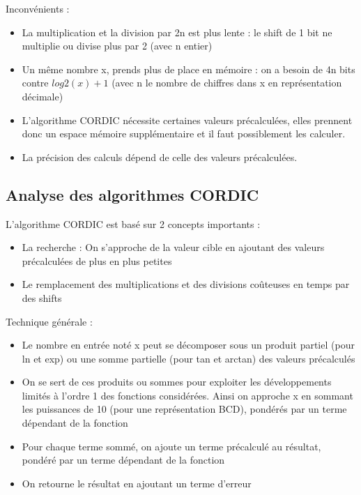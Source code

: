 \documentclass{article}
\begin{document}
\vspace{1em}

Inconvénients :
\begin{itemize}
    \item La multiplication et la division par 2n est plus lente : le shift de 1 bit ne multiplie ou divise plus par 2 (avec n entier)
    \item Un même nombre x, prends plus de place en mémoire : on a besoin de 4n bits contre $log2(x) +1$ (avec n le nombre de chiffres dans x en représentation décimale)
    \item L'algorithme CORDIC nécessite certaines valeurs précalculées, elles prennent donc un espace mémoire supplémentaire et il faut possiblement les calculer.
    \item La précision des calculs dépend de celle des valeurs précalculées.
\end{itemize}

\subsection*{Analyse des algorithmes CORDIC}

L'algorithme CORDIC est basé sur 2 concepts importants :
\begin{itemize}
    \item La recherche : On s'approche de la valeur cible en ajoutant des valeurs précalculées de plus en plus petites
    \item Le remplacement des multiplications et des divisions coûteuses en temps par des shifts
\end{itemize}

\vspace{1em}

Technique générale :
\begin{itemize}
    \item Le nombre en entrée noté x peut se décomposer sous un produit partiel (pour ln et exp) ou une somme partielle (pour tan et arctan) des valeurs précalculés
    \item On se sert de ces produits ou sommes pour exploiter les développements  limités à l'ordre 1 des fonctions considérées. Ainsi on approche x en sommant les puissances de 10 (pour une représentation BCD), pondérés par un terme dépendant de la fonction
    \item Pour chaque terme sommé, on ajoute un terme précalculé au résultat, pondéré par un terme dépendant de la fonction
    \item On retourne le résultat en ajoutant un terme d'erreur
\end{itemize}
\end{document}
